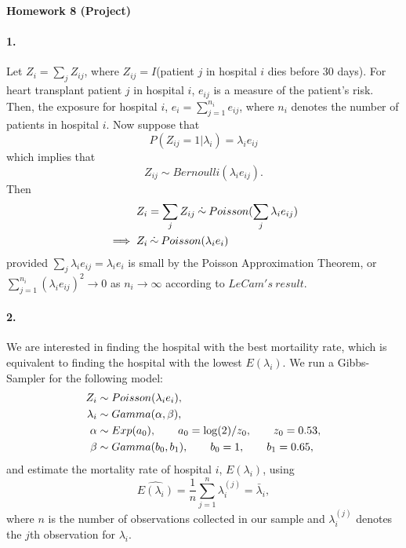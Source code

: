 \documentclass[12pt, leqno]{article}
\begin{document}
\pagestyle{fancy}

\begin{center}
{\large {\bf Homework 8 (Project)}} \\
\end{center}

\paragraph{1.} Let $Z_i = \sum_j Z_{ij}$, where 
$Z_{ij} = I$(patient
$j$ in hospital $i$ dies before $30$ days). For heart transplant
patient $j$ in hospital $i$, $e_{ij}$ is a measure of the patient's
risk. Then, the exposure for hospital $i$, $e_i = \sum_{j=1}^{n_i} e_{ij}$, where $n_i$ denotes the
number of patients in hospital $i$.
 Now suppose that 
\[
P(Z_{ij} = 1|\lambda_i) = \lambda_i e_{ij} 
\]
which implies that 
\[
 Z_{ij} \sim
Bernoulli(\lambda_i e_{ij}).
\] 
Then 
\begin{align}
Z_i &= \sum_j Z_{ij} \: \dot{\sim} \:
Poisson(\sum_j \lambda_i e_{ij}) \notag \\ 
\implies Z_i &\: \dot{\sim} \:
Poisson( \lambda_i e_{i}) \notag 
\end{align} 
provided $\sum_j \lambda_i e_{ij} = \lambda_i e_{i}$ is small by the
Poisson Approximation Theorem, or $\sum_{j=1}^{n_i} (\lambda_i e_{ij})^2 \rightarrow 0$ as $n_i \rightarrow
\infty$ according to
$LeCam's \: result$.

\paragraph{2.} We are interested in finding the hospital with the best
mortaility rate, which is equivalent to finding the hospital with the
lowest $E(\lambda_i)$. We run a Gibbs-Sampler for the following model:
\begin{align}
Z_i & \sim Poisson(\lambda_i e_i), \notag \\
\lambda_i & \sim Gamma(\alpha, \beta), \notag \\
\alpha & \sim Exp(a_0), \qquad{} a_0 = \log(2)/z_0, \qquad{} z_0 = 0.53, \notag \\
\beta & \sim Gamma(b_0, b_1),  \qquad{} b_0 = 1, \qquad{} b_1 = 0.65, \notag 
\end{align}
and estimate the mortality rate of hospital $i$, $E(\lambda_i)$, using 
\[
\widehat{E(\lambda_i)} = \frac{1}{n} \sum_{j=1}^n \lambda_i^{(j)} = \bar{\lambda}_i,
\]
where $n$ is the number of observations collected in our sample and $\lambda_i^{(j)}$
denotes the $j$th observation for $\lambda_i$.
\end{document}
